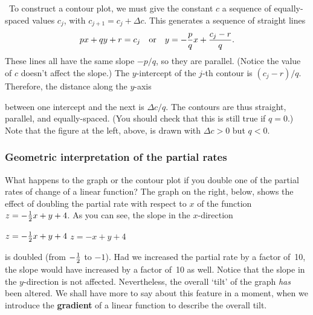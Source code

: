 {{{{
\hfill
\quad \ To construct a contour plot, we must give the constant $c$ a sequence of equally-spaced values $c_j$, with $c_{j+1} = c_j + \Delta c$.  This generates a sequence of straight lines
	\[
px + qy + r = c_j \quad \mbox{or} \quad 
		y = -{p \over q}x + {c_j - r \over q}.
\]
These lines all have the same slope $-p/q$, so they are parallel.  (Notice the value of $c$ doesn't affect the slope.)  The $y$-intercept of the $j$-th contour is $(c_j - r)/q$.  Therefore, the distance along the $y$-axis 
\linebreak
\vspace{-10pt}

\noindent
between one intercept and the next is $\Delta c/q$.  The contours are thus straight, parallel, and equally-spaced.  (You should check that this is still true if $q = 0$.)  Note that the figure at the left, above, is drawn with $\Delta c > 0$ but $q < 0$.

\subsubsection{Geometric interpretation of the partial rates}

	What happens to the graph or the contour plot if you double one of the partial rates of change of a linear function?   
The graph on the right, below, shows the effect of doubling the partial rate with respect to $x$ of the function $z = -{1 \over 2}x + y + 4$.  As you can see, the slope in the $x$-direction 
\linebreak	
 \vspace{-10pt}
	
\vspace{164pt}

{\small
	\noindent
	\hspace{35pt}
	$z = -{\textstyle {1 \over 2}} x  + y + 4$
	\hspace{105pt}
	$z = -x + y + 4$
}

\newpage

\noindent
is doubled (from $-{1 \over 2}$ to $-1$).  Had we increased the partial rate by a factor of~10, the slope would have increased by a factor of~10 as well.  Notice that the slope in the $y$-direction is not affected.  
Nevertheless, the overall `tilt' of the graph {\em has\/} been altered.  We shall have more to say about this feature in a moment, when we introduce the {\bf gradient} of a linear function to describe the overall tilt.  
\medskip

}}}}
